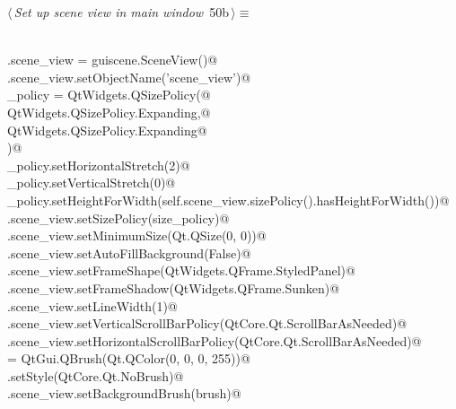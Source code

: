 \documentclass[
    a4paper,      %
    10pt,         %
    openright,    %
    notitlepage,  %
    parskip=half, %
]{scrreprt}       %
\theoremstyle{definition}                    %
\begin{document}
\begin{flushleft} \small
\begin{minipage}{\linewidth}\label{scrap74}\raggedright\small
{} $\langle\,${\itshape Set up scene view in main window}\nobreak\ {\footnotesize {50b}}$\,\rangle\equiv$
\vspace{-1ex}
\begin{list}{}{} \item
\mbox{}\lstinline@@\\
\mbox{}\lstinline@self.scene_view = guiscene.SceneView()@\\
\mbox{}\lstinline@self.scene_view.setObjectName('scene_view')@\\
\mbox{}\lstinline@size_policy = QtWidgets.QSizePolicy(@\\
\mbox{}\lstinline@    QtWidgets.QSizePolicy.Expanding,@\\
\mbox{}\lstinline@    QtWidgets.QSizePolicy.Expanding@\\
\mbox{}\lstinline@)@\\
\mbox{}\lstinline@size_policy.setHorizontalStretch(2)@\\
\mbox{}\lstinline@size_policy.setVerticalStretch(0)@\\
\mbox{}\lstinline@size_policy.setHeightForWidth(self.scene_view.sizePolicy().hasHeightForWidth())@\\
\mbox{}\lstinline@self.scene_view.setSizePolicy(size_policy)@\\
\mbox{}\lstinline@self.scene_view.setMinimumSize(Qt.QSize(0, 0))@\\
\mbox{}\lstinline@self.scene_view.setAutoFillBackground(False)@\\
\mbox{}\lstinline@self.scene_view.setFrameShape(QtWidgets.QFrame.StyledPanel)@\\
\mbox{}\lstinline@self.scene_view.setFrameShadow(QtWidgets.QFrame.Sunken)@\\
\mbox{}\lstinline@self.scene_view.setLineWidth(1)@\\
\mbox{}\lstinline@self.scene_view.setVerticalScrollBarPolicy(QtCore.Qt.ScrollBarAsNeeded)@\\
\mbox{}\lstinline@self.scene_view.setHorizontalScrollBarPolicy(QtCore.Qt.ScrollBarAsNeeded)@\\
\mbox{}\lstinline@brush = QtGui.QBrush(Qt.QColor(0, 0, 0, 255))@\\
\mbox{}\lstinline@brush.setStyle(QtCore.Qt.NoBrush)@\\
\mbox{}\lstinline@self.scene_view.setBackgroundBrush(brush)@\\

\end{list}
\end{minipage}
\end{flushleft}
\end{document}
